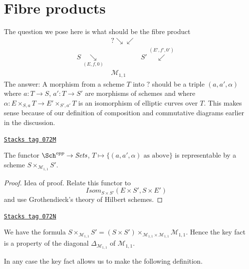 \section{Fibre products}
\label{stacks-introduction-section-fibre-products}
The question we pose here is what should be the fibre product
$$
\begin{array}{ccc} & ? \searrow\swarrow &  \\ S \underset{(E, f, 0)}{\searrow} &  & S' \overset{(E', f', 0')}{\swarrow} \\  & \mathcal{M}_{1, 1} & \end{array}
$$
The answer: A morphism from a scheme $T$ into $?$ should be a triple
$(a, a', \alpha)$ where
$a : T \to S$, $a' : T \to S'$ are morphisms of schemes
and where $\alpha : E \times_{S, a} T \to E' \times_{S', a'} T$ is
an isomorphism of elliptic curves over $T$. This makes sense
because of our definition of composition and commutative diagrams
earlier in the discussion.

\begin{lemma}

\label{stacks-introduction-lemma-key-fact}
\href{https://stacks.math.columbia.edu/tag/072M}{\texttt{Stacks tag 072M}}

The functor $\Sch^{opp} \to \textit{Sets}$,
$T \mapsto \{(a, a', \alpha)\text{ as above}\}$
is representable by a scheme $S \times_{\mathcal{M}_{1, 1}} S'$.
\end{lemma}

\begin{proof}
Idea of proof. Relate this functor to
$$
\mathit{Isom}_{S \times S'}(E \times S', S \times E')
$$
and use Grothendieck's theory of Hilbert schemes.
\end{proof}

\begin{remark}[Diagonal]
\label{stacks-introduction-remark-diagonal}
\href{https://stacks.math.columbia.edu/tag/072N}{\texttt{Stacks tag 072N}}

We have the formula
$S \times_{\mathcal{M}_{1, 1}} S' =
(S \times S')
\times_{\mathcal{M}_{1, 1} \times \mathcal{M}_{1, 1}}
\mathcal{M}_{1, 1}$.
Hence the key fact is a property of the diagonal
$\Delta_{\mathcal{M}_{1, 1}}$ of $\mathcal{M}_{1, 1}$.
\end{remark}

In any case the key fact allows us to make the following definition.


